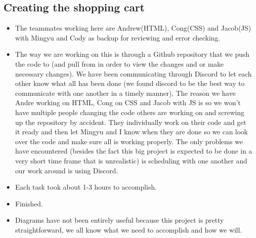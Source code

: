 \documentclass[12pt]{article}
\begin{document}
		\subsection{Creating the shopping cart}
		\begin{itemize}

		\item The teammates working here are Andrew(HTML), Cong(CSS) and Jacob(JS) with Mingyu and Cody as backup for reviewing and error checking.

		\item The way we are working on this is through a Github repository that we push the code to (and pull from in order to view the changes and or make necessary changes).  We have been communicating through Discord to let each other know what all has been done (we found discord to be the best way to communicate with one another in a timely manner).  The reason we have Andre working on HTML, Cong on CSS and Jacob with JS is so we won’t have multiple people changing the code others are working on and screwing up the repository by accident.  They individually work on their code and get it ready and then let Mingyu and I know when they are done so we can look over the code and make sure all is working properly.  The only problems we have encountered (besides the fact this big project is expected to be done in a very short time frame that is unrealistic) is scheduling with one another and our work around is using Discord.

		\item Each task took about 1-3 hours to accomplish.

		\item Finished.

		\item Diagrams have not been entirely useful because this project is pretty straightforward, we all know what we need to accomplish and how we will.
		\end{itemize}
\end{document}
